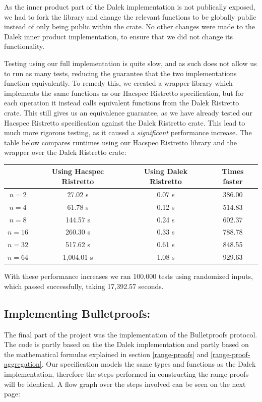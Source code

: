 \documentclass{article}
\begin{document}
As the inner product part of the Dalek implementation is not publically
exposed, we had to fork the library and change the relevant functions
to be globally public instead of only being public within the crate. No
other changes were made to the Dalek inner product implementation, to
ensure that we did not change its functionality.

Testing using our full implementation is quite slow, and as such
does not allow us to run as many tests, reducing the guarantee that
the two implementations function equivalently. To remedy this, we
created a wrapper library which implements the same functions as our
Hacspec Ristretto specification, but for each operation it instead calls
equivalent functions from the Dalek Ristretto crate. This still gives
us an equivalence guarantee, as we have already tested our Hacspec
Ristretto specification against the Dalek Ristretto crate. This lead
to much more rigorous testing, as it caused a \textit{significant}
performance increase. The table below compares runtimes using our
Hacspec Ristretto library and the wrapper over the Dalek Ristretto
crate:

\begin{center}
\begin{tabular}{ c|c|c|c } 
          & Using Hacspec Ristretto & Using Dalek Ristretto & Times faster \\ \hline\hline
 $n = 2$  & 27.02 s    & 0.07 s & 386.00 \\ \hline
 $n = 4$  & 61.78 s    & 0.12 s & 514.83 \\ \hline
 $n = 8$  & 144.57 s   & 0.24 s & 602.37 \\ \hline
 $n = 16$ & 260.30 s   & 0.33 s & 788.78 \\ \hline
 $n = 32$ & 517.62 s   & 0.61 s & 848.55 \\ \hline
 $n = 64$ & 1,004.01 s & 1.08 s & 929.63 \\ \hline
\end{tabular}
\end{center}

With these performance increases we ran 100,000 tests using
randomized inputs, which passed successfully, taking 17,392.57 seconds.

\subsection{Implementing Bulletproofs:} \label{implementing-bulletproofs}

The final part of the project was the implementation of the Bulletproofs
protocol. The code is partly based on the the Dalek implementation
and partly based on the mathematical formulas explained in section
\ref{range-proofs} and \ref{range-proof-aggregation}. Our specification
models the same types and functions as the Dalek implementation,
therefore the steps performed in constructing the range proofs will
be identical. A flow graph over the steps involved can be seen on the
next page:
\end{document}
